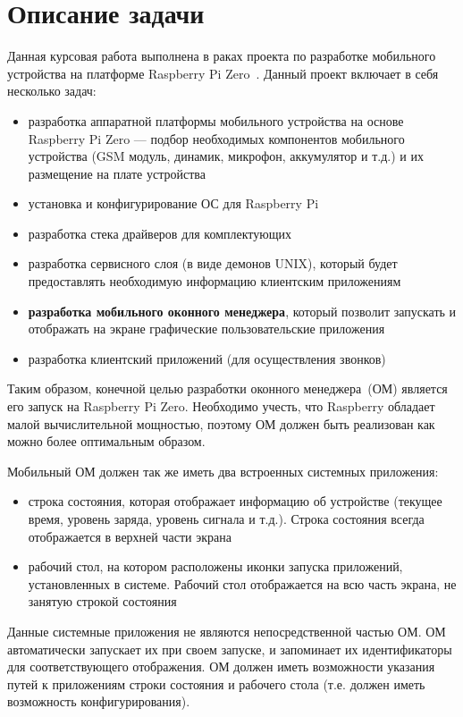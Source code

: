 \section{Описание задачи}
Данная курсовая работа выполнена в раках проекта по разработке мобильного устройства  на платформе Raspberry Pi Zero~\cite{RPiZero}. Данный проект включает в себя несколько задач:
\begin{itemize}
\item разработка аппаратной платформы мобильного устройства на основе Raspberry Pi Zero --- подбор необходимых компонентов мобильного устройства (GSM модуль, динамик, микрофон, аккумулятор и т.д.) и их размещение на плате устройства
\item установка и конфигурирование ОС для Raspberry Pi
\item разработка стека драйверов для комплектующих
\item разработка сервисного слоя (в виде демонов UNIX), который будет предоставлять необходимую информацию клиентским приложениям
\item \textbf{разработка мобильного оконного менеджера}, который позволит запускать и отображать на экране графические пользовательские приложения
\item разработка клиентский приложений (для осуществления звонков)
\end{itemize}

Таким образом, конечной целью разработки оконного менеджера~(ОМ) является его запуск на Raspberry Pi Zero. Необходимо учесть, что Raspberry обладает малой вычислительной мощностью, поэтому ОМ должен быть реализован как можно более оптимальным образом.

Мобильный ОМ должен так же иметь два встроенных системных приложения:
\begin{itemize}
\item строка состояния, которая отображает информацию об устройстве (текущее время, уровень заряда, уровень сигнала и т.д.). Строка состояния всегда отображается в верхней части экрана
\item рабочий стол, на котором расположены иконки запуска приложений, установленных в системе. Рабочий стол отображается на всю часть экрана, не занятую строкой состояния
\end{itemize}
Данные системные приложения не являются непосредственной частью ОМ. ОМ автоматически запускает их при своем запуске, и запоминает их идентификаторы для соответствующего отображения. ОМ должен иметь возможности указания путей к приложениям строки состояния и рабочего стола (т.е. должен иметь возможность конфигурирования).

